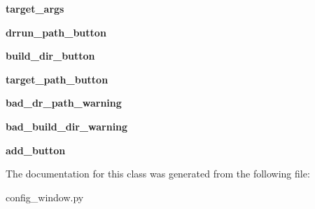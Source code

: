 \begin{DoxyCompactItemize}
{\bfseries target\+\_\+args}
\item 
\mbox{\label{classconfig__window_1_1_config_window_afd13f236d5d83ace7fea56f77f24c533}} 
{\bfseries drrun\+\_\+path\+\_\+button}
\item 
\mbox{\label{classconfig__window_1_1_config_window_a2b4adeddf0690f51363cd61fd6515f7a}} 
{\bfseries build\+\_\+dir\+\_\+button}
\item 
\mbox{\label{classconfig__window_1_1_config_window_a86b5ca2ba2913431f16609be7e8998ab}} 
{\bfseries target\+\_\+path\+\_\+button}
\item 
\mbox{\label{classconfig__window_1_1_config_window_af38228b6674f96ae1a12a1e8afad3497}} 
{\bfseries bad\+\_\+dr\+\_\+path\+\_\+warning}
\item 
\mbox{\label{classconfig__window_1_1_config_window_a9b33c417c57c90759943c6254aaa8bc4}} 
{\bfseries bad\+\_\+build\+\_\+dir\+\_\+warning}
\item 
\mbox{\label{classconfig__window_1_1_config_window_a11b170b0c169c403872cebb4ba9ed860}} 
{\bfseries add\+\_\+button}
\end{DoxyCompactItemize}


The documentation for this class was generated from the following file\+:\begin{DoxyCompactItemize}
\item 
config\+\_\+window.\+py\end{DoxyCompactItemize}
